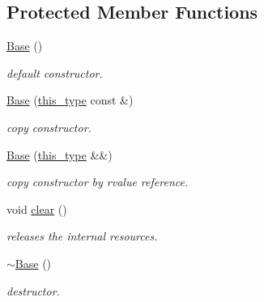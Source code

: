\subsection*{Protected Member Functions}
\begin{DoxyCompactItemize}
\item 
\hypertarget{classhryky_1_1writer_1_1_base_a5ffe0568374d8b9b4c4ec32953fd6453}{\hyperlink{classhryky_1_1writer_1_1_base_a5ffe0568374d8b9b4c4ec32953fd6453}{Base} ()}\label{classhryky_1_1writer_1_1_base_a5ffe0568374d8b9b4c4ec32953fd6453}

\begin{DoxyCompactList}\small\item\em default constructor. \end{DoxyCompactList}\item 
\hypertarget{classhryky_1_1writer_1_1_base_a663fa22bf8197e0acf1adc4ff4f74cd8}{\hyperlink{classhryky_1_1writer_1_1_base_a663fa22bf8197e0acf1adc4ff4f74cd8}{Base} (\hyperlink{classhryky_1_1writer_1_1_base_a2da49d5140295f9ae7f5f27c9677278e}{this\-\_\-type} const \&)}\label{classhryky_1_1writer_1_1_base_a663fa22bf8197e0acf1adc4ff4f74cd8}

\begin{DoxyCompactList}\small\item\em copy constructor. \end{DoxyCompactList}\item 
\hypertarget{classhryky_1_1writer_1_1_base_a57c0cdd6ae3bce9a37f2b550a8fcd949}{\hyperlink{classhryky_1_1writer_1_1_base_a57c0cdd6ae3bce9a37f2b550a8fcd949}{Base} (\hyperlink{classhryky_1_1writer_1_1_base_a2da49d5140295f9ae7f5f27c9677278e}{this\-\_\-type} \&\&)}\label{classhryky_1_1writer_1_1_base_a57c0cdd6ae3bce9a37f2b550a8fcd949}

\begin{DoxyCompactList}\small\item\em copy constructor by rvalue reference. \end{DoxyCompactList}\item 
\hypertarget{classhryky_1_1writer_1_1_base_a135bce05655e290c78fa83196199a576}{void \hyperlink{classhryky_1_1writer_1_1_base_a135bce05655e290c78fa83196199a576}{clear} ()}\label{classhryky_1_1writer_1_1_base_a135bce05655e290c78fa83196199a576}

\begin{DoxyCompactList}\small\item\em releases the internal resources. \end{DoxyCompactList}\item 
\hypertarget{classhryky_1_1writer_1_1_base_a722da881b6c70cfcbde9243abcfbf334}{\hyperlink{classhryky_1_1writer_1_1_base_a722da881b6c70cfcbde9243abcfbf334}{$\sim$\-Base} ()}\label{classhryky_1_1writer_1_1_base_a722da881b6c70cfcbde9243abcfbf334}

\begin{DoxyCompactList}\small\item\em destructor. \end{DoxyCompactList}\end{DoxyCompactItemize}
